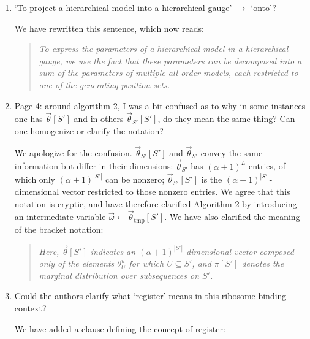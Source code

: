 \documentclass[11pt]{article}
\newenvironment{response}{\par\color{responseblue}}{\par}
\newenvironment{msquote}
  {\begin{quote}\color{responseblue}\itshape\noindent\ignorespaces}
  {\end{quote}}
\begin{document}
\begin{enumerate}
\item `To project a hierarchical model into a hierarchical gauge' $\rightarrow$
`onto'?

\begin{response}
We have rewritten this sentence, which now reads:
\end{response}

\begin{msquote}
To express the parameters of a hierarchical model in a hierarchical gauge, we use
the fact that these parameters can be decomposed into a sum of the parameters of
multiple all-order models, each restricted to one of the generating position
sets.
\end{msquote}

\item Page 4: around algorithm 2, I was a bit confused as to why in some instances
one has $\vec{\theta}[S']$ and in others $\vec{\theta}_{S'}[S']$, do they mean the
same thing? Can one homogenize or clarify the notation?

\begin{response}
We apologize for the confusion. $\vec{\theta}_{S'}[S']$ and $\vec{\theta}_{S'}$
convey the same information but differ in their dimensions: $\vec{\theta}_{S'}$ has
$(\alpha+1)^L$ entries, of which only $(\alpha+1)^{|S'|}$ can be nonzero;
$\vec{\theta}_{S'}[S']$ is the $(\alpha+1)^{|S'|}$-dimensional vector restricted to
those nonzero entries. We agree that this notation is cryptic, and have
therefore clarified Algorithm 2 by introducing an intermediate variable
$\vec{\omega} \gets \vec{\theta}_{\textrm{tmp}}[S']$. We have also clarified the
meaning of the bracket notation:
\end{response}

\begin{msquote}
Here, $\vec{\theta}[S']$ indicates an $(\alpha+1)^{|S'|}$-dimensional vector
composed only of the elements $\theta_U^u$ for which $U \subseteq S'$, and
$\pi[S']$ denotes the marginal distribution over subsequences on $S'$.
\end{msquote}

\item Could the authors clarify what `register' means in this ribosome-binding
context?

\begin{response}
We have added a clause defining the concept of register:
\end{response}


\end{enumerate}
\end{document}
